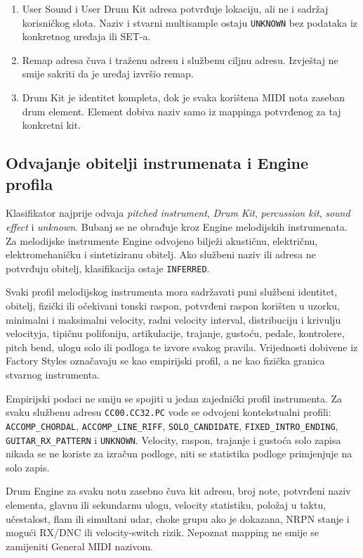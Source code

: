 \documentclass[11pt]{article}
\begin{document}
\begin{enumerate}[label=I\arabic*.]
    \item User Sound i User Drum Kit adresa potvrđuje lokaciju, ali ne i sadržaj
    korisničkog slota. Naziv i stvarni multisample ostaju \texttt{UNKNOWN} bez
    podataka iz konkretnog uređaja ili SET-a.

    \item Remap adresa čuva i traženu adresu i službenu ciljnu adresu. Izvještaj
    ne smije sakriti da je uređaj izvršio remap.

    \item Drum Kit je identitet kompleta, dok je svaka korištena MIDI nota
    zaseban drum element. Element dobiva naziv samo iz mappinga potvrđenog za
    taj konkretni kit.
\end{enumerate}

\subsection{Odvajanje obitelji instrumenata i Engine profila}

Klasifikator najprije odvaja \emph{pitched instrument}, \emph{Drum Kit},
\emph{percussion kit}, \emph{sound effect} i \emph{unknown}. Bubanj se ne
obrađuje kroz Engine melodijskih instrumenata. Za melodijske instrumente Engine
odvojeno bilježi akustičnu, električnu, elektromehaničku i sintetiziranu
obitelj. Ako službeni naziv ili adresa ne potvrđuju obitelj, klasifikacija ostaje
\texttt{INFERRED}.

Svaki profil melodijskog instrumenta mora sadržavati puni službeni identitet,
obitelj, fizički ili očekivani tonski raspon, potvrđeni raspon korišten u
uzorku, minimalni i maksimalni velocity, radni velocity interval, distribuciju
i krivulju velocityja, tipičnu polifoniju, artikulacije, trajanje, gustoću,
pedale, kontrolere, pitch bend, ulogu solo ili podloga te izvore svakog pravila.
Vrijednosti dobivene iz Factory Styles označavaju se kao empirijski profil, a
ne kao fizička granica stvarnog instrumenta.

Empirijski podaci ne smiju se spojiti u jedan zajednički profil instrumenta.
Za svaku službenu adresu \texttt{CC00.CC32.PC} vode se odvojeni kontekstualni
profili: \texttt{ACCOMP\_CHORDAL}, \texttt{ACCOMP\_LINE\_RIFF},
\texttt{SOLO\_CANDIDATE}, \texttt{FIXED\_INTRO\_ENDING},
\texttt{GUITAR\_RX\_PATTERN} i \texttt{UNKNOWN}. Velocity, raspon, trajanje i
gustoća solo zapisa nikada se ne koriste za izračun podloge, niti se statistika
podloge primjenjuje na solo zapis.

Drum Engine za svaku notu zasebno čuva kit adresu, broj note, potvrđeni naziv
elementa, glavnu ili sekundarnu ulogu, velocity statistiku, položaj u taktu,
učestalost, flam ili simultani udar, choke grupu ako je dokazana, NRPN stanje i
mogući RX/DNC ili velocity-switch rizik. Nepoznat mapping ne smije se zamijeniti
General MIDI nazivom.
\end{document}
